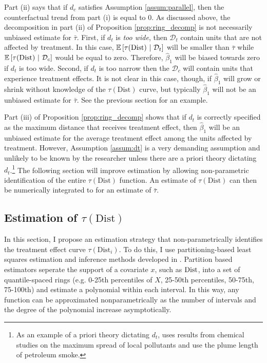 \documentclass[10pt]{article}
\newcommand{\dist}{\text{Dist}}
\begin{document}
Part (ii) says that if $d_c$ satisfies Assumption \ref{assum:parallel}, then the counterfactual trend from part (i) is equal to 0. As discussed above, the decomposition in part (ii) of Proposition \ref{prop:ring_decomp} is not necessarily unbiased estimate for $\bar{\tau}$. First, if $d_t$ is \emph{too wide}, then $\mathcal{D}_t$ contain units that are not affected by treatment. In this case, $\condexpec{\tau(\dist)}{\mathcal{D}_t}$ will be smaller than $\bar{\tau}$ while $\condexpec{\tau(\dist)}{\mathcal{D}_c}$ would be equal to zero. Therefore, $\hat{\beta}_1$ will be biased towards zero if $d_t$ is too wide. Second, if $d_t$ is {too narrow} then the $\mathcal{D}_c$ will contain units that experience treatment effects. It is not clear in this case, though, if $\hat{\beta}_1$ will grow or shrink without knowledge of the $\tau(\dist)$ curve, but typically $\hat{\beta}_1$ will not be an unbiased estimate for $\bar{\tau}$. See the previous section for an example. 

Part (iii) of Proposition \ref{prop:ring_decomp} shows that if $d_t$ is correctly specified as the maximum distance that receives treatment effect, then $\hat{\beta}_1$ will be an unbiased estimate for the average treatment effect among the units affected by treatment. However, Assumption \ref{assum:dt} is a very demanding assumption and unlikely to be known by the researcher unless there are a priori theory dictating $d_t$.\footnote{As an example of a priori theory dictating $d_t$, \citet{Currie_Davis_Greenstone_Walker_2015} uses results from chemical studies on the maximum spread of local pollutants and \citet{Marcus_2021} use the plume length of petroleum smoke.} The following section will improve estimation by allowing non-parametric identification of the entire $\tau(\dist)$ function. An estimate of $\tau(\dist)$ can then be numerically integrated to for an estimate of $\bar{\tau}$.

\subsection{Estimation of $\tau(\dist)$}\label{sec:lspartition}

In this section, I propose an estimation strategy that non-parametrically identifies the treatment effect curve $\tau(\dist_i)$. To do this, I use partitioning-based least squares estimation and inference methods developed in \citet{Cattaneo_Farrell_Feng_2019,Cattaneo_Crump_Farrell_Feng_2019}. Partition based estimators seperate the support of a covariate $x$, such as $\text{\dist}$, into a set of quantile-spaced rings (e.g. 0-25th percentiles of $X$, 25-50th percentiles, 50-75th, 75-100th) and estimate a polynomial within each interval. In this way, any function can be approximated nonparametrically as the number of intervals and the degree of the polynomial increase asymptotically. 
\end{document}
